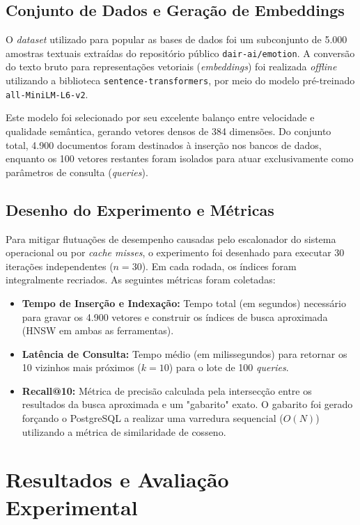 \documentclass[a4paper, 12pt]{article} %
\begin{document}
\subsection{Conjunto de Dados e Geração de Embeddings}
O \textit{dataset} utilizado para popular as bases de dados foi um subconjunto de 5.000 amostras textuais extraídas do repositório público \texttt{dair-ai/emotion}. A conversão do texto bruto para representações vetoriais (\textit{embeddings}) foi realizada \textit{offline} utilizando a biblioteca \texttt{sentence-transformers}, por meio do modelo pré-treinado \texttt{all-MiniLM-L6-v2}. 

Este modelo foi selecionado por seu excelente balanço entre velocidade e qualidade semântica, gerando vetores densos de 384 dimensões. Do conjunto total, 4.900 documentos foram destinados à inserção nos bancos de dados, enquanto os 100 vetores restantes foram isolados para atuar exclusivamente como parâmetros de consulta (\textit{queries}).

\subsection{Desenho do Experimento e Métricas}
Para mitigar flutuações de desempenho causadas pelo escalonador do sistema operacional ou por \textit{cache misses}, o experimento foi desenhado para executar 30 iterações independentes ($n=30$). Em cada rodada, os índices foram integralmente recriados. As seguintes métricas foram coletadas:

\begin{itemize}
    \item \textbf{Tempo de Inserção e Indexação:} Tempo total (em segundos) necessário para gravar os 4.900 vetores e construir os índices de busca aproximada (HNSW em ambas as ferramentas).
    \item \textbf{Latência de Consulta:} Tempo médio (em milissegundos) para retornar os 10 vizinhos mais próximos ($k=10$) para o lote de 100 \textit{queries}.
    \item \textbf{Recall@10:} Métrica de precisão calculada pela intersecção entre os resultados da busca aproximada e um "gabarito" exato. O gabarito foi gerado forçando o PostgreSQL a realizar uma varredura sequencial ($O(N)$) utilizando a métrica de similaridade de cosseno.
\end{itemize}


\section{Resultados e Avaliação Experimental}
\label{sec:result}
\end{document}
